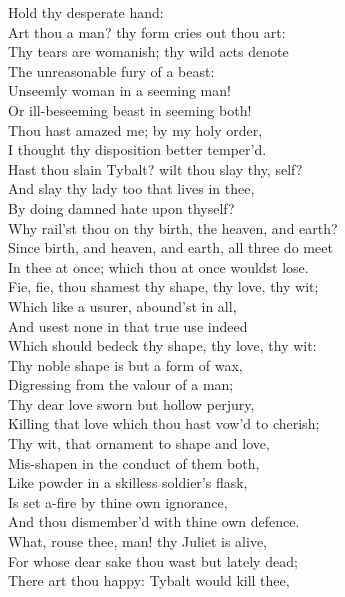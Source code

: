 \begin{speech}
Hold thy desperate hand: \\
Art thou a man? thy form cries out thou art: \\
Thy tears are womanish; thy wild acts denote \\
The unreasonable fury of a beast: \\
Unseemly woman in a seeming man! \\
Or ill-beseeming beast in seeming both! \\
Thou hast amazed me; by my holy order, \\
I thought thy disposition better temper'd. \\
Hast thou slain Tybalt? wilt thou slay thy, self? \\
And slay thy lady too that lives in thee, \\
By doing damned hate upon thyself? \\
Why rail'st thou on thy birth, the heaven, and earth? \\
Since birth, and heaven, and earth, all three do meet \\
In thee at once; which thou at once wouldst lose. \\
Fie, fie, thou shamest thy shape, thy love, thy wit; \\
Which like a usurer, abound'st in all, \\
And usest none in that true use indeed \\
Which should bedeck thy shape, thy love, thy wit: \\
Thy noble shape is but a form of wax, \\
Digressing from the valour of a man; \\
Thy dear love sworn but hollow perjury, \\
Killing that love which thou hast vow'd to cherish; \\
Thy wit, that ornament to shape and love, \\
Mis-shapen in the conduct of them both, \\
Like powder in a skilless soldier's flask, \\
Is set a-fire by thine own ignorance, \\
And thou dismember'd with thine own defence. \\
What, rouse thee, man! thy Juliet is alive, \\
For whose dear sake thou wast but lately dead; \\
There art thou happy: Tybalt would kill thee, \\

\end{speech}
